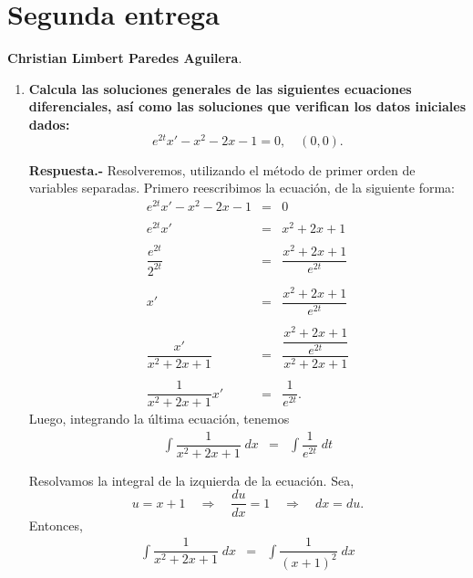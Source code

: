 \section*{\center \large Segunda entrega}
\begin{center}
    \textbf{Christian Limbert Paredes Aguilera}.
\end{center}
\vspace{1cm}

\begin{enumerate}

    \item \textbf{\boldmath Calcula las soluciones generales de las siguientes ecuaciones diferenciales, así como las soluciones que verifican los datos iniciales dados:
	$$e^{2t}x'-x^2-2x-1=0,\quad (0,0).$$}
	\setlength{\columnseprule}{.1pt}
	\begin{multicols}{2}
	\textbf{Respuesta.-}\; Resolveremos, utilizando el método de primer orden de variables separadas. Primero reescribimos la ecuación, de la siguiente forma:
	$$
	\begin{array}{rcl}
	    e^{2t}x'-x^2-2x-1&=&0 \\\\
	    e^{2t}x'&=&x^2+2x+1\\\\
	    \dfrac{e^{2t}}{2^{2t}}&=&\dfrac{x^2+2x+1}{e^{2t}}\\\\
	    x'&=&\dfrac{x^2+2x+1}{e^{2t}}\\\\
	    \dfrac{x'}{x^2+2x+1}&=&\dfrac{\dfrac{x^2+2x+1}{e^{2t}}}{x^2+2x+1}\\\\
	    \dfrac{1}{x^2+2x+1}x'&=&\dfrac{1}{e^{2t}}.
	\end{array}
	$$
	Luego, integrando la última ecuación, tenemos\\
	$$
	\begin{array}{rcl}
	    \displaystyle\int \dfrac{1}{x^2+2x+1}\; dx &=&\displaystyle\int \dfrac{1}{e^{2t}}\; dt\\\\
	\end{array}
	$$
	Resolvamos la integral de la izquierda de la ecuación. Sea, 
	$$u=x+1 \quad \Rightarrow \quad  \dfrac{du}{dx}=1 \quad \Rightarrow \quad dx=du.$$ 
	Entonces,
	$$
	\begin{array}{rcl}
	    \displaystyle\int \dfrac{1}{x^2+2x+1}\; dx &=& \displaystyle\int \dfrac{1}{(x+1)^2}\; dx\\\\

\end{array}$$
\end{multicols}
\end{enumerate}
